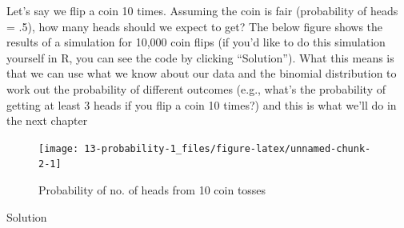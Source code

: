 \documentclass[
  oneside]{book}
\begin{document}
Let's say we flip a coin 10 times. Assuming the coin is fair (probability of heads = .5), how many heads should we expect to get? The below figure shows the results of a simulation for 10,000 coin flips (if you'd like to do this simulation yourself in R, you can see the code by clicking ``Solution''). What this means is that we can use what we know about our data and the binomial distribution to work out the probability of different outcomes (e.g., what's the probability of getting at least 3 heads if you flip a coin 10 times?) and this is what we'll do in the next chapter

\begin{figure}

{\centering \texttt{[image: 13-probability-1\_files/figure-latex/unnamed-chunk-2-1]} 

}

\caption{Probability of no. of heads from 10 coin tosses}\label{fig:unnamed-chunk-2}
\end{figure}

Solution
\end{document}
